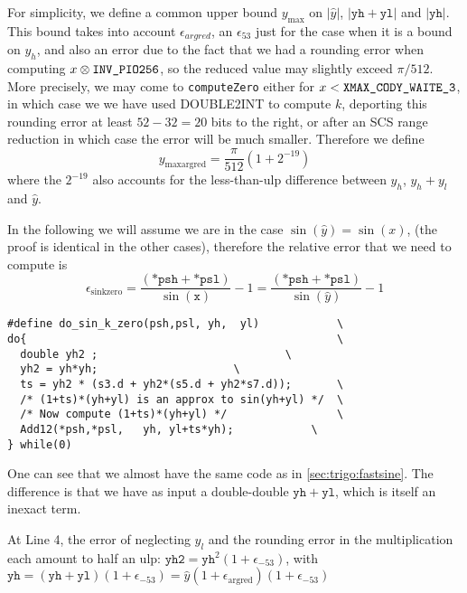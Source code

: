 For simplicity, we define a common upper bound $y_{\max}$ on
$|\hat{y}|$, $|\mathtt{yh}+\mathtt{yl}|$ and $|\mathtt{yh}|$. This
bound takes into account $\epsilon_{argred}$, an $\epsilon_{53}$ just
for the case when it is a bound on $y_h$, and also an error due to the
fact that we had a rounding error when computing
$x\otimes\verb!INV_PIO256!$, so the reduced value may slightly
exceed $\pi/512$. More precisely, we may come to \texttt{computeZero}
either for $x<\verb!XMAX_CODY_WAITE_3!$, in which case we we have used
DOUBLE2INT to compute $k$, deporting this rounding error at least $52-32=20$
bits to the right, or after an SCS range reduction in which case the
error will be much smaller. Therefore we define
\begin{equation}
  y_{\mathrm{maxargred}} = \frac{\pi}{512}(1+2^{-19})
  \label{eq:ymaxsink0}  
\end{equation}
where the $2^{-19}$ also accounts for the less-than-ulp difference
between $y_h$, $y_h+y_l$ and $\widehat{y}$.

In the following we will
assume we are in the case $\sin(\hat{y}) = \sin(x)$, (the proof is
identical in the other cases), therefore the relative error that we need
to compute is
\begin{equation}
  \epsilon_{\mathrm{sinkzero}} = \frac{(\mathtt{*psh} + \mathtt{*psl})}{\sin(\mathtt{x})} -1 = \frac{(\mathtt{*psh} + \mathtt{*psl})}{\sin(\hat{y})} -1
\end{equation}


 \begin{lstlisting}[caption={do\_sin\_k\_zero},firstnumber=1]
#define do_sin_k_zero(psh,psl, yh,  yl)            \
do{                                                \
  double yh2 ;	              			   \
  yh2 = yh*yh;					   \
  ts = yh2 * (s3.d + yh2*(s5.d + yh2*s7.d));	   \
  /* (1+ts)*(yh+yl) is an approx to sin(yh+yl) */  \
  /* Now compute (1+ts)*(yh+yl) */                 \
  Add12(*psh,*psl,   yh, yl+ts*yh);	           \
} while(0)						   
\end{lstlisting}

One can see that we almost have the same code as in
\ref{sec:trigo:fastsine}. The difference is that we have as input
a double-double $\mathtt{yh}+\mathtt{yl}$, which is itself an inexact term. 

At Line 4, the error of neglecting $y_l$ and the rounding error in the
multiplication each amount to half an ulp:
  $\mathtt{yh2}=\mathtt{yh}^2(1+\epsilon_{-53})$, 
 with $\mathtt{yh} = (\mathtt{yh}+\mathtt{yl})(1+\epsilon_{-53}) = \hat{y}(1+\epsilon_{\mathrm{argred}})(1+\epsilon_{-53})$

